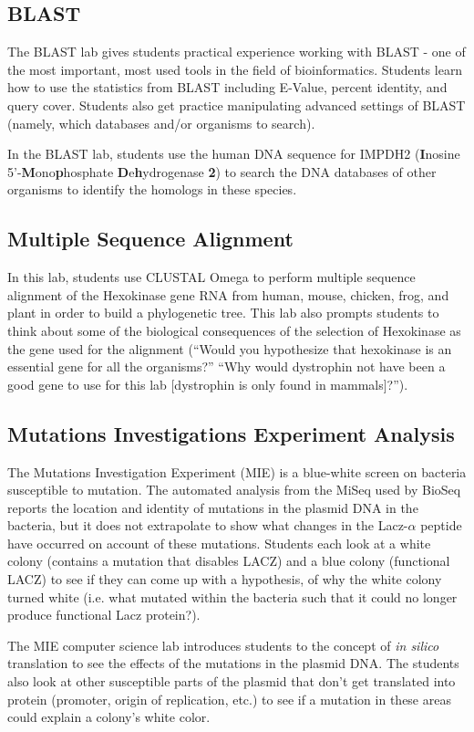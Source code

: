 \documentclass{report}
\begin{document}
\subsection{BLAST}
The BLAST lab gives students practical experience working with BLAST - one of the most important, most used tools in the field of bioinformatics. Students learn how to use the statistics from BLAST including E-Value, percent identity, and query cover. Students also get practice manipulating advanced settings of BLAST (namely, which databases and/or organisms to search).

In the BLAST lab, students use the human DNA sequence for IMPDH2 (\textbf{I}nosine 5'-\textbf{M}ono\textbf{p}hosphate \textbf{D}e\textbf{h}ydrogenase \textbf{2}) to search the DNA databases of other organisms to identify the homologs in these species.

\subsection{Multiple Sequence Alignment}
In this lab, students use CLUSTAL Omega to perform multiple sequence alignment of the Hexokinase gene RNA from human, mouse, chicken, frog, and plant in order to build a phylogenetic tree. This lab also prompts students to think about some of the biological consequences of the selection of Hexokinase as the gene used for the alignment (``Would you hypothesize that hexokinase is an essential gene for all the organisms?'' ``Why would dystrophin not have been a good gene to use for this lab [dystrophin is only found in mammals]?'').


\subsection{Mutations Investigations Experiment Analysis}
The Mutations Investigation Experiment (MIE) is a blue-white screen on bacteria susceptible to mutation. The automated analysis from the MiSeq used by BioSeq reports the location and identity of mutations in the plasmid DNA in the bacteria, but it does not extrapolate to show what changes in the Lacz-$\alpha$ peptide have occurred on account of these mutations. Students each look at a white colony (contains a mutation that disables LACZ) and a blue colony (functional LACZ) to see if they can come up with a hypothesis, of why the white colony turned white (i.e. what mutated within the bacteria such that it could no longer produce functional Lacz protein?).

The MIE computer science lab introduces students to the concept of \emph{in silico} translation to see the effects of the mutations in the plasmid DNA. The students also look at other susceptible parts of the plasmid that don't get translated into protein (promoter, origin of replication, etc.) to see if a mutation in these areas could explain a colony's white color.
\end{document}
